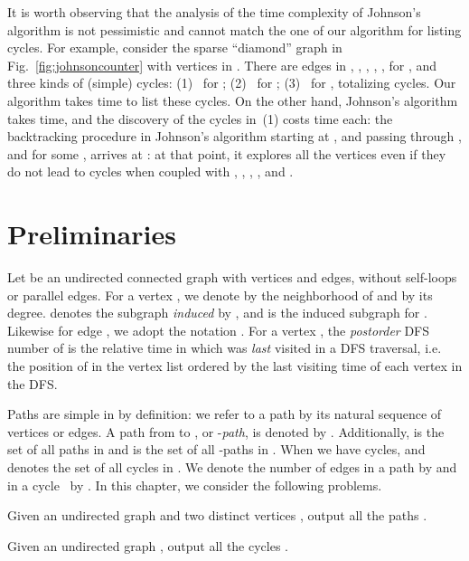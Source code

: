 It is worth observing that the analysis of the time complexity of Johnson's algorithm
is not pessimistic and cannot match the one of our algorithm for
listing cycles.  For example, consider the sparse ``diamond'' graph
 in Fig.~\ref{fig:johnsoncounter} with 
vertices in . There
are  edges in , , ,
, , for , and three kinds of
(simple) cycles:
(1)~ for ;
(2)~ for ;
(3)~ for ,
totalizing  cycles.
Our algorithm takes 
time to list these cycles.  On the other hand, Johnson's algorithm
takes  time, and the discovery of the  cycles
in~(1) costs  time each: the backtracking
procedure in Johnson's algorithm starting at , and passing through
,  and  for some , arrives at : at that point, it
explores all the vertices   even if they do not lead
to cycles when coupled with , , , , and .

\section{Preliminaries}

Let  be an undirected connected graph with  vertices
and  edges, without self-loops or parallel edges. For a vertex
, we denote by  the neighborhood of  and by
 its degree.   denotes the subgraph \emph{induced}
by , and  is the induced subgraph  for . Likewise for edge , we adopt
the notation . For a vertex ,
the \emph{postorder} DFS number of  is the relative time in which
 was \emph{last} visited in a DFS traversal, i.e. the position of
 in the vertex list ordered by the last visiting time of each
vertex in the DFS.

Paths are simple in  by definition: we refer to a path  by its
natural sequence of vertices or edges.  A path  from  to ,
or -\emph{path}, is denoted by . Additionally,
 is the set of all paths in  and
 is the set of all -paths in .  When
 we have cycles, and  denotes the set of all
cycles in . We denote the number of edges in a path  by
 and in a cycle~ by . In this chapter, we consider the following
problems.

\begin{problem}
	\label{prob:liststpaths}
	Given an undirected graph  and two distinct vertices
	, output all the paths .
\end{problem} 

\begin{problem}
	\label{prob:listcycles}
	Given an undirected graph , output all the cycles .
\end{problem} 

